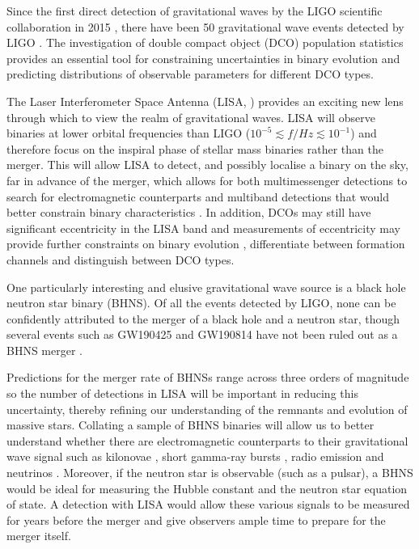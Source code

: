 Since the first direct detection of gravitational waves by the LIGO scientific collaboration in 2015 \citep{Abbott+2016_first_detection}, there have been 50 gravitational wave events detected by LIGO \citep{Abbott+2019_GWTC1,Abbott+2020_GWTC2}. The investigation of double compact object (DCO) population statistics provides an essential tool for constraining uncertainties in binary evolution and predicting distributions of observable parameters for different DCO types. 

The Laser Interferometer Space Antenna (LISA, \citealp{Amaro-Seoane+2017}) provides an exciting new lens through which to view the realm of gravitational waves. LISA will observe binaries at lower orbital frequencies than LIGO ($10^{-5} \lesssim f / \unit{Hz} \lesssim 10^{-1}$) and therefore focus on the inspiral phase of stellar mass binaries rather than the merger. This will allow LISA to detect, and possibly localise a binary on the sky, far in advance of the merger, which allows for both multimessenger detections to search for electromagnetic counterparts and multiband detections that would better constrain binary characteristics \citep[e.g.][]{Gerosa+2019}. In addition, DCOs may still have significant eccentricity in the LISA band and measurements of eccentricity may provide further constraints on binary evolution \citep[e.g.][]{Vigna-Gomez+2018}, differentiate between formation channels and distinguish between DCO types.

One particularly interesting and elusive gravitational wave source is a black hole neutron star binary (BHNS). Of all the events detected by LIGO, none can be confidently attributed to the merger of a black hole and a neutron star, though several events such as GW190425 and GW190814 have not been ruled out as a BHNS merger \citep{Abbott+2020_GW190425,Abbott+2020_GW190814}.

Predictions for the merger rate of BHNSs range across three orders of magnitude \citep[e.g.][]{Broekgaarden+2021} so the number of detections in LISA will be important in reducing this uncertainty, thereby refining our understanding of the remnants and evolution of massive stars. Collating a sample of BHNS binaries will allow us to better understand whether there are electromagnetic counterparts to their gravitational wave signal such as kilonovae \citep[e.g.][]{Metzger+2017}, short gamma-ray bursts \citep[e.g.][]{Gompertz+2020}, radio emission \citep[e.g.][]{Hotokezaka+2016} and neutrinos \citep[e.g.][]{Kyutoku+2018}. Moreover, if the neutron star is observable (such as a pulsar), a BHNS would be ideal for measuring the Hubble constant \citep[e.g.][]{Feeney+2020} and the neutron star equation of state. A detection with LISA would allow these various signals to be measured for years before the merger and give observers ample time to prepare for the merger itself.

